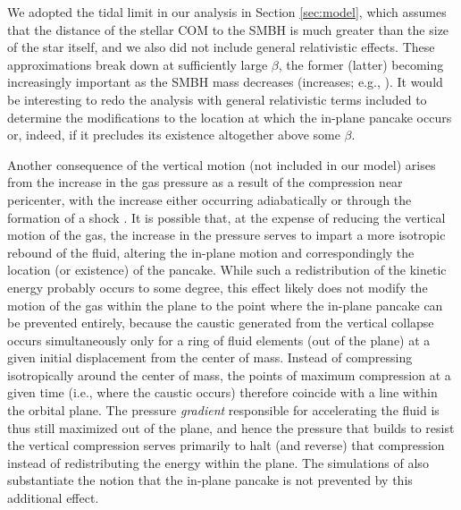 \documentclass[twocolumn]{aastex62}
\begin{document}
We adopted the tidal limit in our analysis in Section \ref{sec:model}, which assumes that the distance of the stellar COM to the SMBH is much greater than the size of the star itself, and we also did not include general relativistic effects. These approximations break down at sufficiently large $\beta$, the former (latter) becoming increasingly important as the SMBH mass decreases (increases; e.g., \citealt{kesden12, stone13, gafton15, stone19, darbha19}). It would be interesting to redo the analysis with general relativistic terms included to determine the modifications to the location at which the in-plane pancake occurs or, indeed, if it precludes its existence altogether above some $\beta$.

Another consequence of the vertical motion (not included in our model) arises from the increase in the gas pressure as a result of the compression near pericenter, with the increase either occurring adiabatically or through the formation of a shock \citep{bicknell83, kobayashi04, brassart08, guillochon09}. It is possible that, at the expense of reducing the vertical motion of the gas, the increase in the pressure serves to impart a more isotropic rebound of the fluid, altering the in-plane motion and correspondingly the location (or existence) of the pancake. While such a redistribution of the kinetic energy probably occurs to some degree, this effect likely does not modify the motion of the gas within the plane to the point where the in-plane pancake can be prevented entirely, because the caustic generated from the vertical collapse occurs simultaneously only for a ring of fluid elements (out of the plane) at a given initial displacement from the center of mass. Instead of compressing isotropically around the center of mass, the points of maximum compression at a given time (i.e., where the caustic occurs) therefore coincide with a line within the orbital plane. The pressure \emph{gradient} responsible for accelerating the fluid is thus still maximized out of the plane, and hence the pressure that builds to resist the vertical compression serves primarily to halt (and reverse) that compression instead of redistributing the energy within the plane. The simulations of \citet{steinberg19} also substantiate the notion that the in-plane pancake is not prevented by this additional effect.
\end{document}
